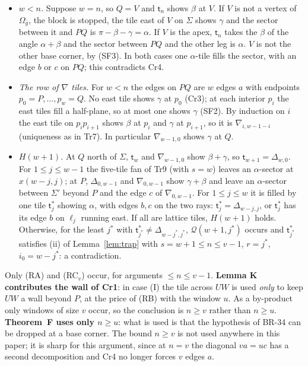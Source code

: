 \documentclass[11pt,reqno]{amsart}
\theoremstyle{plain}
\theoremstyle{definition}
\begin{document}
\begin{itemize}
\item[\textbf{Cr5}] \emph{$w<n$.} Suppose $w=n$, so $Q=V$ and $\mathsf t_n$ shows $\beta$ at $V$. If $V$ is not a vertex of $\Omega_{\bar g}$, the block is stopped, the tile east of $V$ on $\Sigma$ shows $\gamma$ and the sector between it and $PQ$ is $\pi-\beta-\gamma=\alpha$. If $V$ is the apex, $\mathsf t_n$ takes the $\beta$ of the angle $\alpha+\beta$ and the sector between $PQ$ and the other leg is $\alpha$. $V$ is not the other base corner, by (SF3). In both cases one $\alpha$-tile fills the sector, with an edge $b$ or $c$ on $PQ$; this contradicts Cr4.
\item[\textbf{Cr6}] \emph{The row of $\nabla$ tiles.} For $w<n$ the edges on $PQ$ are $w$ edges $a$ with endpoints $p_0=P,\dots,p_w=Q$. No east tile shows $\gamma$ at $p_0$ (Cr3); at each interior $p_i$ the east tiles fill a half-plane, so at most one shows $\gamma$ (SF2). By induction on $i$ the east tile on $p_ip_{i+1}$ shows $\beta$ at $p_i$ and $\gamma$ at $p_{i+1}$, so it is $\nabla_{i,w-1-i}$ (uniqueness as in Tr7). In particular $\nabla_{w-1,0}$ shows $\gamma$ at $Q$.
\item[\textbf{Cr7}] \emph{$H(w+1)$.} At $Q$ north of $\Sigma$, $\mathsf t_w$ and $\nabla_{w-1,0}$ show $\beta+\gamma$, so $\mathsf t_{w+1}=\Delta_{w,0}$. For $1\le j\le w-1$ the five-tile fan of Tr9 (with $s=w$) leaves an $\alpha$-sector at $x(w-j,j)$; at $P$, $\Delta_{0,w-1}$ and $\nabla_{0,w-1}$ show $\gamma+\beta$ and leave an $\alpha$-sector between $\Sigma'$ beyond $P$ and the edge $c$ of $\nabla_{0,w-1}$. For $1\le j\le w$ it is filled by one tile $\mathsf t^\ast_j$ showing $\alpha$, with edges $b,c$ on the two rays: $\mathsf t^\ast_j=\Delta_{w-j,j}$, or $\mathsf t^\ast_j$ has its edge $b$ on $\ell_j$ running east. If all are lattice tiles, $H(w+1)$ holds. Otherwise, for the least $j^\ast$ with $\mathsf t^\ast_{j^\ast}\ne\Delta_{w-j^\ast,j^\ast}$, $\mathcal Q(w+1,j^\ast)$ occurs and $\mathsf t^\ast_{j^\ast}$ satisfies (ii) of Lemma~\ref{lem:trap} with $s=w+1\le n\le v-1$, $r=j^\ast$, $i_0=w-j^\ast$: a contradiction.
\end{itemize}
Only (RA) and (RC$_v$) occur, for arguments $\le n\le v-1$. \textbf{Lemma K contributes the wall of Cr1}: in case (I) the tile across $UW$ is used \emph{only} to keep $UW$ a wall beyond $P$, at the price of (RB) with the window $u$. As a by-product only windows of size $v$ occur, so the conclusion is $n\ge v$ rather than $n\ge u$. \textbf{Theorem~F uses only $n\ge u$}: what is used is that the hypothesis of BR-34 can be dropped at a base corner. The bound $n\ge v$ is not used anywhere in this paper; it is sharp for this argument, since at $n=v$ the diagonal $va=uc$ has a second decomposition and Cr4 no longer forces $v$ edges $a$.
\end{document}
